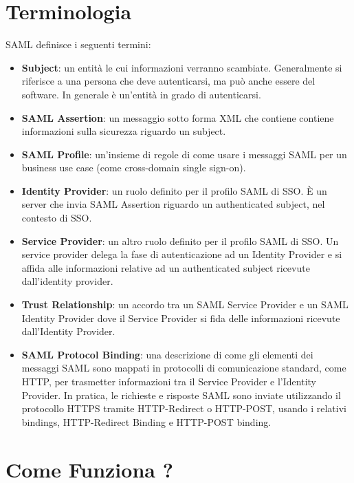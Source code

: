 \section{Terminologia}

SAML definisce i seguenti termini:

\begin{itemize}
    \item \textbf{Subject}: un entità le cui informazioni verranno scambiate.
          Generalmente si riferisce a una persona che deve autenticarsi,
          ma può anche essere
          del software. In generale è un'entità in grado di autenticarsi.
    \item \textbf{SAML Assertion}: un messaggio sotto forma XML che contiene
          contiene informazioni sulla sicurezza riguardo un subject.
    \item \textbf{SAML Profile}: un'insieme di regole di come usare i messaggi SAML
          per un business use case (come cross-domain single sign-on).
    \item \textbf{Identity Provider}: un ruolo definito per il profilo SAML di SSO.
          È un server che invia SAML Assertion riguardo un authenticated subject, nel
          contesto di SSO.
    \item \textbf{Service Provider}: un altro ruolo definito per il profilo SAML di
          SSO. Un service provider delega la fase di autenticazione ad un Identity
          Provider e si affida alle informazioni relative ad un authenticated
          subject ricevute dall'identity provider.
    \item \textbf{Trust Relationship}: un accordo tra un SAML Service Provider e un
          SAML Identity Provider dove il Service Provider si fida delle informazioni
          ricevute dall'Identity Provider.
    \item \textbf{SAML Protocol Binding}: una descrizione di come gli elementi
          dei messaggi SAML sono mappati in protocolli di comunicazione standard,
          come HTTP, per trasmetter informazioni tra il Service Provider e l'Identity
          Provider. In pratica, le richieste e risposte SAML sono inviate utilizzando
          il protocollo HTTPS tramite HTTP-Redirect o HTTP-POST, usando i relativi
          bindings, HTTP-Redirect Binding e HTTP-POST binding.
\end{itemize}

\section{Come Funziona ?}